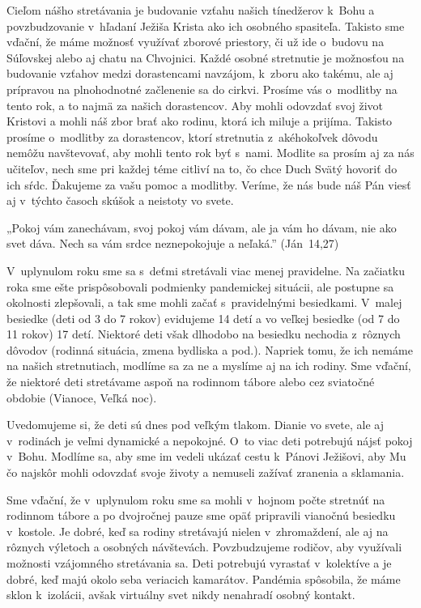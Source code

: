 Cieľom nášho stretávania je budovanie vzťahu našich tínedžerov k~Bohu a povzbudzovanie v~hľadaní Ježiša Krista ako ich osobného spasiteľa. Takisto sme vďační, že máme možnosť využívať zborové priestory, či už ide o~budovu na Súľovskej alebo aj chatu na Chvojnici. Každé osobné stretnutie je možnosťou na budovanie vzťahov medzi dorastencami navzájom, k~zboru ako takému, ale aj prípravou na plnohodnotné začlenenie sa do cirkvi.
Prosíme vás o~modlitby na tento rok, a to najmä za našich dorastencov. Aby mohli odovzdať svoj život Kristovi a mohli náš zbor brať ako rodinu, ktorá ich miluje a prijíma. Takisto prosíme o~modlitby za dorastencov, ktorí stretnutia z~akéhokoľvek dôvodu nemôžu navštevovať, aby mohli tento rok byť s~nami. Modlite sa prosím aj za nás učiteľov, nech sme pri každej téme citliví na to, čo chce Duch Svätý hovoriť do ich sŕdc. Ďakujeme za vašu pomoc a modlitby. Veríme, že nás bude náš Pán viesť aj v~týchto časoch skúšok a neistoty vo svete.

„Pokoj vám zanechávam, svoj pokoj vám dávam, ale ja vám ho dávam, nie ako svet dáva. Nech sa vám srdce neznepokojuje a neľaká.” (Ján~14,27)

\vfill\break



V~uplynulom roku sme sa s~deťmi stretávali viac menej pravidelne. Na začiatku roka sme ešte prispôsobovali podmienky pandemickej situácii, ale postupne sa okolnosti zlepšovali, a tak sme mohli začať s~pravidelnými besiedkami. V~malej besiedke (deti od 3 do 7 rokov) evidujeme 14 detí a vo veľkej besiedke (od 7 do 11 rokov) 17 detí. Niektoré deti však dlhodobo na besiedku nechodia z~rôznych dôvodov (rodinná situácia, zmena bydliska a pod.). Napriek tomu, že ich nemáme na našich stretnutiach, modlíme sa za ne a myslíme aj na ich rodiny. Sme vďační, že niektoré deti stretávame aspoň na rodinnom tábore alebo cez sviatočné obdobie (Vianoce, Veľká noc).

Uvedomujeme si, že deti sú dnes pod veľkým tlakom. Dianie vo svete, ale aj v~rodinách je veľmi dynamické a nepokojné. O~to viac deti potrebujú nájsť pokoj v~Bohu. Modlíme sa, aby sme im vedeli ukázať cestu k~Pánovi Ježišovi, aby Mu čo najskôr mohli odovzdať svoje životy a nemuseli zažívať zranenia a sklamania.

Sme vďační, že v~uplynulom roku sme sa mohli v~hojnom počte stretnúť na rodinnom tábore a po dvojročnej pauze sme opäť pripravili vianočnú besiedku v~kostole. Je dobré, keď sa rodiny stretávajú nielen v~zhromaždení, ale aj na rôznych výletoch a osobných návštevách.
Povzbudzujeme rodičov, aby využívali možnosti vzájomného stretávania sa. Deti potrebujú vyrastať v~kolektíve a je dobré, keď majú okolo seba veriacich kamarátov. Pandémia spôsobila, že máme sklon k~izolácii, avšak virtuálny svet nikdy nenahradí osobný kontakt.

